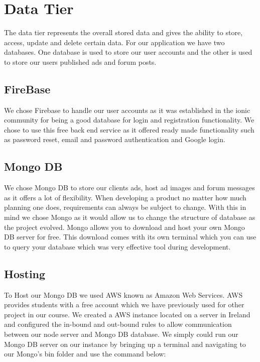 \section{Data Tier}

The data tier represents the overall stored data and gives the ability to store, access, update and delete certain data. For our application we have two databases. One database is used to store our user accounts and the other is used to store our users published ads and forum posts.

\subsection{FireBase}
We chose Firebase to handle our user accounts as it was established in the ionic community for being a good database for login and registration functionality. We chose to use this free back end service as it offered ready made functionality such as password reset, email and password authentication and Google login. 

\subsection{Mongo DB}

We chose Mongo DB to store our clients ads, host ad images and forum messages as it offers a lot of flexibility. When developing a product no matter how much planning one does, requirements can always be subject to change. With this in mind we chose Mongo as it would allow us to change the structure of database as the project evolved. Mongo allows you to download and host your own Mongo DB server for free. This download comes with its own terminal which you can use to query your database which was very effective tool during development.

\subsection{Hosting}

To Host our Mongo DB we used AWS known as Amazon Web Services. AWS provides students with a free account which we have previously used for other project in our course. We created a AWS instance located on a server in Ireland and configured the in-bound and out-bound rules to allow communication between our node server and Mongo DB database. We simply could run our Mongo DB server on our instance by bringing up a terminal and navigating to our Mongo’s bin folder and use the command below:

